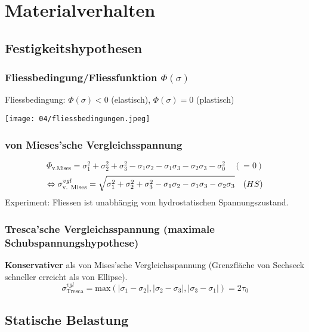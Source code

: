 \vspace{-3mm}
\section{Materialverhalten}{}
    \subsection{Festigkeitshypothesen}
        \subsubsection{Fliessbedingung/Fliessfunktion $\Phi(\sigma)$}
            Fliessbedingung: $\Phi(\sigma)<0$ (elastisch), $\Phi(\sigma)=0$ (plastisch)
            \begin{center}
            \vspace{-2mm}
                \texttt{[image: 04/fliessbedingungen.jpeg]}
            \end{center}
            
        \subsubsection{von Mieses'sche Vergleichsspannung}
            \[\Phi_{\textrm{v.Mises}}= \sigma_1^2+\sigma_2^2+\sigma_3^2-\sigma_1\sigma_2-\sigma_1\sigma_3-\sigma_2\sigma_3 -\sigma_0^2\quad(=0)\]
            \[\Leftrightarrow \sigma_{\textrm{v. Mises}}^{vgl}= \sqrt{\sigma_1^2+\sigma_2^2+\sigma_3^2-\sigma_1\sigma_2-\sigma_1\sigma_3-\sigma_2\sigma_3} \quad\textrm(HS)\]
            Experiment: Fliessen ist unabhängig vom hydrostatischen Spannungszustand.
        \subsubsection{Tresca'sche Vergleichsspannung (maximale Schubspannungshypothese)}
            \textbf{Konservativer} als von Mises'sche Vergleichsspannung (Grenzfläche von Sechseck schneller erreicht als von Ellipse).
            \vspace{-2mm}\[\sigma_{\textrm{Tresca}}^{vgl}=\textrm{max} \left(|\sigma_1-\sigma_2|,|\sigma_2-\sigma_3|,|\sigma_3-\sigma_1| \right) =2\tau_0\]
    \subsection{Statische Belastung}
        
